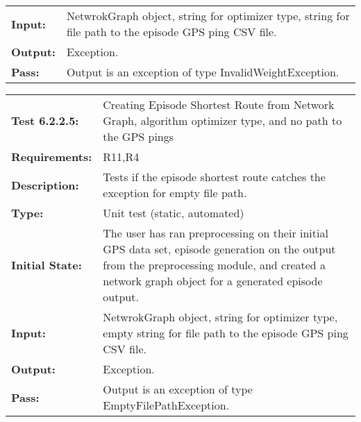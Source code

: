 \documentclass[12pt, titlepage]{article}
\begin{document}
{\begin{tabular}{|l|p{10cm}|}
    \bf{Input}: & NetwrokGraph object, string for optimizer type, string for file path to the episode GPS ping CSV file. \\
    \bf{Output}: & Exception. \\
    \bf{Pass}: & Output is an exception of type InvalidWeightException. \\
    \hline
\end{tabular}
\begin{tabular}{|l|p{10cm}|}
    \hline
    \bf{Test} 6.2.2.5: & Creating Episode Shortest Route from Network Graph, algorithm optimizer type, and no path to the GPS pings \\
    \bf{Requirements}: &  R11,R4\\
    \bf{Description}: & Tests if the episode shortest route catches the exception for empty file path. \\
    \bf{Type}: & Unit test (static, automated) \\
    \bf{Initial State}: & The user has ran preprocessing on their initial GPS data set, episode generation on the output from the preprocessing module, and created a network graph object for a generated episode output. \\
    \bf{Input}: & NetwrokGraph object, string for optimizer type, empty string for file path to the episode GPS ping CSV file. \\
    \bf{Output}: & Exception. \\
    \bf{Pass}: & Output is an exception of type EmptyFilePathException. \\
    \hline
\end{tabular}
}
\end{document}
